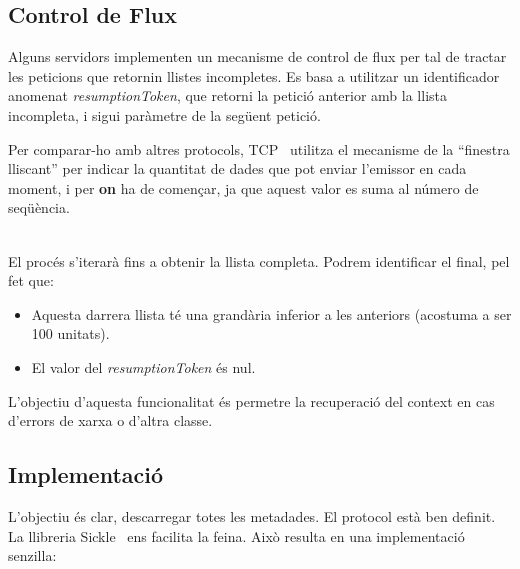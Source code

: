 \clearpage

\subsection{Control de Flux}\label{subsec:flux-control}

Alguns servidors implementen un mecanisme de control de flux per tal de tractar les peticions que retornin llistes incompletes.
Es basa a utilitzar un identificador anomenat \textit{resumptionToken}, que retorni la petició anterior amb la llista incompleta, i sigui paràmetre de la següent petició. \\

\begin{tcolorbox}[colback=blue!5!white, colframe=blue!75!black, title=Finestra lliscant]
    Per comparar-ho amb altres protocols, \gls{TCP}~\cite{tcp} utilitza el mecanisme de la ``finestra lliscant'' per indicar la quantitat de dades que pot enviar l'emissor en cada moment,
    i per \textbf{on} ha de començar, ja que aquest valor es suma al número de seqüència.
\end{tcolorbox}

\noindent \\
El procés s'iterarà fins a obtenir la llista completa.
Podrem identificar el final, pel fet que:

\begin{itemize}
    \item Aquesta darrera llista té una grandària inferior a les anteriors (acostuma a ser 100 unitats).
    \item El valor del \textit{resumptionToken} és nul. \\
\end{itemize}

\noindent
L'objectiu d'aquesta funcionalitat és permetre la recuperació del context en cas d'errors de xarxa o d'altra classe.

\clearpage

\subsection{Implementació}\label{subsec:metadata-implemntation}

L'objectiu és clar, descarregar totes les metadades.
El protocol està ben definit.
La llibreria Sickle~\cite{Sickle} ens facilita la feina.
Això resulta en una implementació senzilla:


